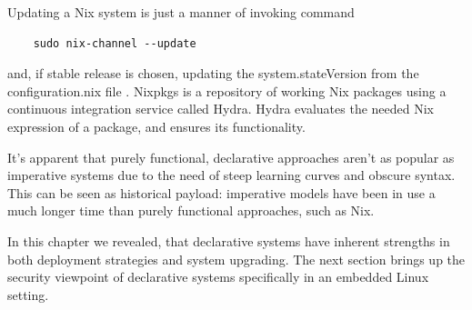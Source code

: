Updating a Nix system is just a manner of invoking command

\begin{lstlisting}
    sudo nix-channel --update
\end{lstlisting}

and, if stable release is chosen, updating the system.stateVersion
from the configuration.nix file \cite{nixosNixOSManual}. Nixpkgs is a
repository of working Nix packages using a continuous integration
service called Hydra. Hydra evaluates the needed Nix expression of a
package, and ensures its functionality. \cite{nixosNixOSManual}

It's apparent that purely functional, declarative approaches aren't as popular
as imperative systems due to the need of steep learning curves and
obscure syntax. This can be seen as historical payload: imperative
models have been in use a much longer time than purely functional
approaches, such as Nix.

In this chapter we revealed, that declarative systems have inherent
strengths in both deployment strategies and system upgrading. The next
section brings up the security viewpoint of declarative systems
specifically in an embedded Linux setting.
